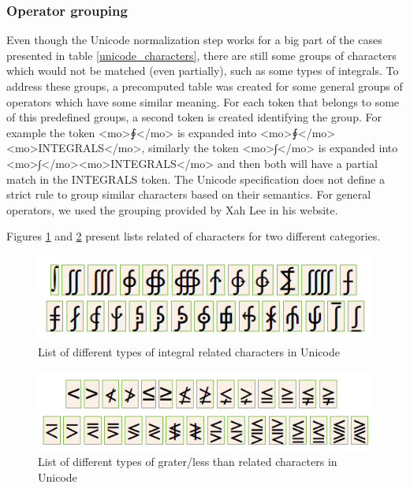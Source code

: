 \subsubsection{Operator grouping}
Even though the Unicode normalization step works for a big part of the cases presented in table \ref{unicode_characters}, there are still some groups of characters which would not be matched (even partially), such as some types of integrals. To address these groups, a precomputed table was created for some general groups of operators which have some similar meaning. For each token that belongs to some of this predefined groups, a second token is created identifying the group.
For example the token <mo>{\unicodefont ∮}</mo> is expanded into <mo>{\unicodefont ∮}</mo><mo>INTEGRALS</mo>, similarly the token <mo>{\unicodefont ∫}</mo> is expanded into <mo>{\unicodefont ∫}</mo><mo>INTEGRALS</mo> and then both will have a partial match in the INTEGRALS token. 
The Unicode specification does not define a strict rule to group similar characters based on their semantics. For general operators, we used the grouping provided by Xah Lee in his website\cite{math_groups}.

Figures \ref{integrals} and \ref{less_greater} present lists related of characters for two different categories.

\begin{figure}[h!]
	\centering
	\includegraphics[height=2 cm]{figures/integrals.png}
	\caption{List of different types of integral related characters in Unicode}
	\label{integrals}
\end{figure}

\begin{figure}[h!]
	\centering
	\includegraphics[height=2 cm]{figures/greater_less.png}
	\caption{List of different types of grater/less than related characters in Unicode}
	\label{less_greater}
\end{figure}

